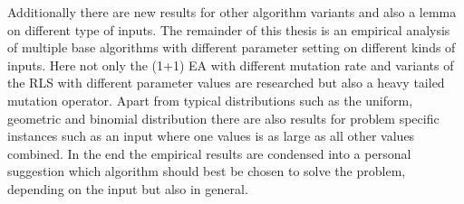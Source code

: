 Additionally there are new results for other algorithm variants and also a lemma on different type of inputs.
The remainder of this thesis is an empirical analysis of multiple base algorithms with different parameter setting on different kinds of inputs.
Here not only the (1+1) EA with different mutation rate and variants of the RLS with different parameter values are researched but also a heavy tailed mutation operator.
Apart from typical distributions such as the uniform, geometric and binomial distribution there are also results for problem specific instances such as an input where one values is as large as all other values combined.
In the end the empirical results are condensed into a personal suggestion which algorithm should best be chosen to solve the problem, depending on the input but also in general.

